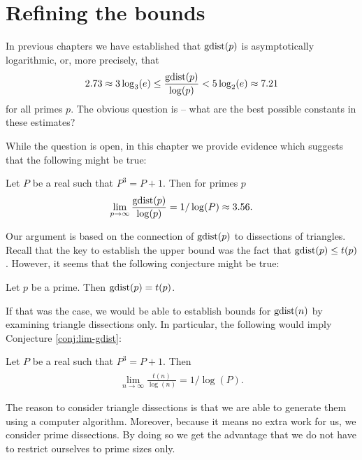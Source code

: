 \chapter{Refining the bounds}
\label{chap:bounds}

In previous chapters we have established that $\mathop{\mathrm{gdist}}(p)$ is asymptotically logarithmic, or, more precisely, that
\begin{align}
	2.73 \approx 3 \log_3(e) \leq \frac{\mathop{\mathrm{gdist}}(p)}{\log(p)} < 5 \log_2(e) \approx 7.21
\end{align}
for all primes $p$. The obvious question is -- what are the best possible constants in these estimates?

While the question is open, in this chapter we provide evidence which suggests that the following might be true:

\begin{conj}
\label{conj:lim-gdist}
Let $P$ be a real such that $P^3=P+1$. Then for primes $p$
\begin{align}
	\lim_{p \rightarrow \infty} \frac{\mathop{\mathrm{gdist}}(p)}{\log(p)} = 1/\log(P) \approx 3.56.
\end{align}
\end{conj}%

Our argument is based on the connection of $\mathop{\mathrm{gdist}}(p)$ to dissections of triangles. Recall that the key to establish the upper bound was the fact that $\mathop{\mathrm{gdist}}(p) \leq t(p)$. However, it seems that the following conjecture might be true:

\begin{conj}
\label{conj:gdistp-equals-tp}
Let $p$ be a prime. Then $\mathop{\mathrm{gdist}}(p) = t(p)$.
\end{conj}%

If that was the case, we would be able to establish bounds for $\mathop{\mathrm{gdist}}(n)$ by examining triangle dissections only. In particular, the following would imply Conjecture \ref{conj:lim-gdist}:

\begin{conj}
\label{conj:lim-hat-tn}
Let $P$ be a real such that $P^3=P+1$. Then
\begin{align}
	\lim_{n \rightarrow \infty} \frac{\hat t(n)}{\log(n)} = 1/\log(P).
\end{align}
\end{conj}%

The reason to consider triangle dissections is that we are able to generate them using a computer algorithm. Moreover, because it means no extra work for us, we consider prime dissections. By doing so we get the advantage that we do not have to restrict ourselves to prime sizes only.


